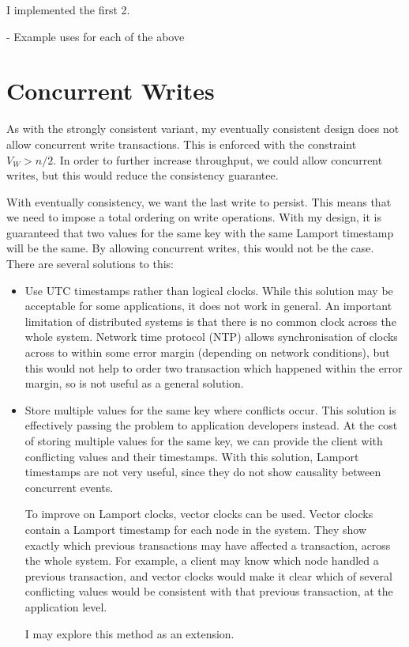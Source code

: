 \documentclass[12pt,a4paper,twoside,openright]{report}
\begin{document}
I implemented the first 2. %

- Example uses for each of the above

\section{Concurrent Writes}

As with the strongly consistent variant, my eventually consistent design does not allow concurrent write transactions. This is enforced with the constraint $V_W > n / 2$. In order to further increase throughput, we could allow concurrent writes, but this would reduce the consistency guarantee.

With eventually consistency, we want the last write to persist. This means that we need to impose a total ordering on write operations. With my design, it is guaranteed that two values for the same key with the same Lamport timestamp will be the same. By allowing concurrent writes, this would not be the case. There are several solutions to this:

\begin{itemize}
\item
Use UTC timestamps rather than logical clocks. While this solution may be acceptable for some applications, it does not work in general. An important limitation of distributed systems is that there is no common clock across the whole system. Network time protocol (NTP) allows synchronisation of clocks across to within some error margin (depending on network conditions), but this would not help to order two transaction which happened within the error margin, so is not useful as a general solution.

\item
Store multiple values for the same key where conflicts occur. This solution is effectively passing the problem to application developers instead. At the cost of storing multiple values for the same key, we can provide the client with conflicting values and their timestamps. With this solution, Lamport timestamps are not very useful, since they do not show causality between concurrent events.

To improve on Lamport clocks, vector clocks can be used. Vector clocks contain a Lamport timestamp for each node in the system. They show exactly which previous transactions may have affected a transaction, across the whole system. For example, a client may know which node handled a previous transaction, and vector clocks would make it clear which of several conflicting values would be consistent with that previous transaction, at the application level.

I may explore this method as an extension.

\end{itemize}
\end{document}
